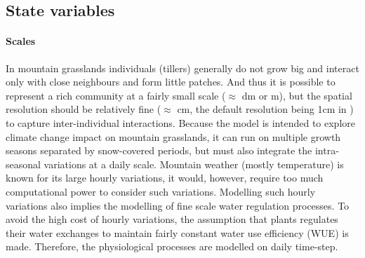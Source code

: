 \subsection{State variables}

\paragraph{Scales}
In mountain grasslands individuals (tillers) generally do not grow big and interact only with close neighbours and form little patches. And thus it is possible to represent a rich community at a fairly small scale ($\approx$ dm or m), but the spatial resolution should be relatively fine ($\approx$ cm, the default resolution being 1cm in \model) to capture inter-individual interactions. Because the model is intended to explore climate change impact on mountain grasslands, it can run on multiple growth seasons separated by snow-covered periods, but must also integrate the intra-seasonal variations at a daily scale. Mountain weather (mostly temperature) is known for its large hourly variations, it would, however, require too much computational power to consider such variations. Modelling such hourly variations also implies the modelling of fine scale water regulation processes. To avoid the high cost of hourly variations, the assumption that plants regulates their water exchanges to maintain fairly constant water use efficiency (WUE) is made. Therefore, the physiological processes are modelled on daily time-step.

